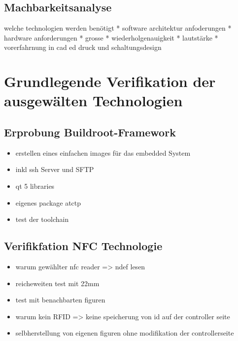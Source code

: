 \hypertarget{machbarkeitsanalyse}{%
\subsection{Machbarkeitsanalyse}\label{machbarkeitsanalyse}}

welche technologien werden benötigt * software architektur anfoderungen
* hardware anforderungen * grosse * wiederholgenauigkeit * lautstärke *
vorerfahrnung in cad ed druck und schaltungsdesign

\hypertarget{grundlegende-verifikation-der-ausgewuxe4lten-technologien}{%
\section{Grundlegende Verifikation der ausgewälten
Technologien}\label{grundlegende-verifikation-der-ausgewuxe4lten-technologien}}

\hypertarget{erprobung-buildroot-framework}{%
\subsection{Erprobung
Buildroot-Framework}\label{erprobung-buildroot-framework}}

\begin{itemize}
\tightlist
\item
  erstellen eines einfachen images für das embedded System
\item
  inkl ssh Server und SFTP
\item
  qt 5 libraries
\item
  eigenes package atctp
\item
  test der toolchain
\end{itemize}

\hypertarget{verifikfation-nfc-technologie}{%
\subsection{Verifikfation NFC
Technologie}\label{verifikfation-nfc-technologie}}

\begin{itemize}
\tightlist
\item
  warum gewählter nfc reader =\textgreater{} ndef lesen
\item
  reicheweiten test mit 22mm
\item
  test mit benachbarten figuren
\item
  warum kein RFID =\textgreater{} keine speicherung von id auf der
  controller seite
\item
  selbherstellung von eigenen figuren ohne modifikation der
  controllerseite
\end{itemize}

